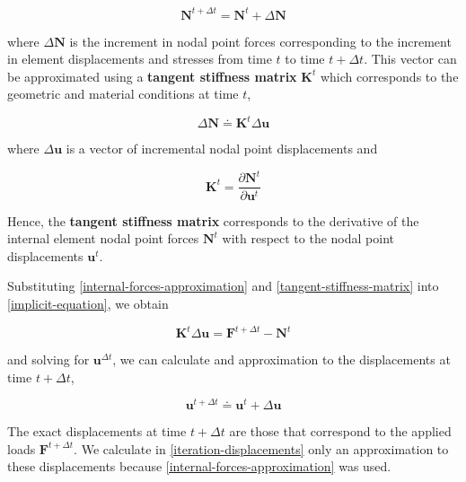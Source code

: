 \documentclass[10pt,b5paper,titlepage]{book}
\begin{document}
\begin{equation}
    \mathbf{N}^{t+\Delta t} = \mathbf{N}^t + \Delta \mathbf{N}
\end{equation}

where $ \Delta \mathbf{N} $ is the increment in nodal point forces corresponding
to the increment in element displacements and stresses from time $ t $ to time
$ t + \Delta t $. This vector can be approximated using a \textbf{tangent stiffness matrix}
$ \mathbf{K}^t $ which corresponds to the geometric and material conditions
at time $ t $,

\begin{equation}\label{internal-forces-approximation}
    \Delta \mathbf{N} \doteq \mathbf{K}^{t} \Delta \mathbf{u}
\end{equation}

where $ \Delta \mathbf{u} $ is a vector of incremental nodal point displacements and

\begin{equation}\label{tangent-stiffness-matrix}
    \mathbf{K}^{t} = \frac{\partial \mathbf{N}^{t}}{\partial \mathbf{u}^{t}}
\end{equation}

Hence, the \textbf{tangent stiffness matrix} corresponds to the derivative of the
internal element nodal point forces $ \mathbf{N}^{t} $ with respect to the
nodal point displacements $ \mathbf{u}^{t} $.

Substituting \eqref{internal-forces-approximation} and
\eqref{tangent-stiffness-matrix} into \eqref{implicit-equation}, we obtain

\begin{equation}\label{iteration-equation}
    \mathbf{K}^{t} \Delta \mathbf{u} = \mathbf{F}^{t + \Delta t} - \mathbf{N}^{t}
\end{equation}

and solving for $ \mathbf{u}^{\Delta t} $, we can calculate and approximation
to the displacements at time $ t + \Delta t $,

\begin{equation}\label{iteration-displacements}
    \mathbf{u}^{t + \Delta t} \doteq \mathbf{u}^{t} + \Delta \mathbf{u}
\end{equation}

The exact displacements at time $ t + \Delta t $ are those that correspond to the
applied loads $ \mathbf{F}^{t + \Delta t} $. We calculate in \eqref{iteration-displacements}
only an approximation to these displacements because \eqref{internal-forces-approximation}
was used.
\end{document}
